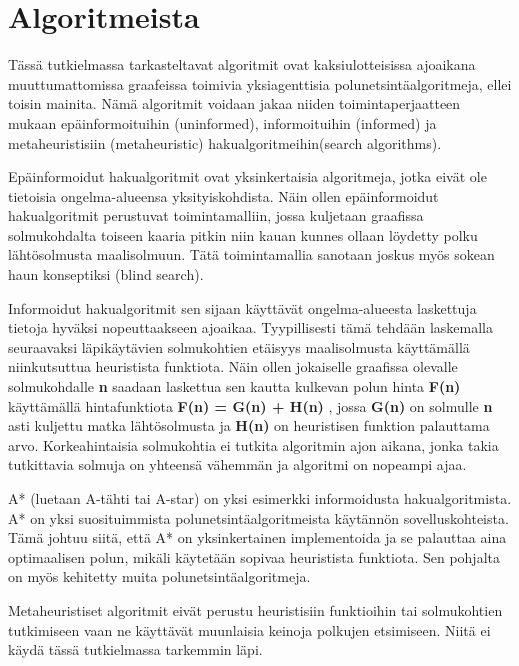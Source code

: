 \section{Algoritmeista}\label{algoritmeista}
Tässä tutkielmassa tarkasteltavat algoritmit ovat kaksiulotteisissa 
ajoaikana muuttumattomissa graafeissa toimivia yksiagenttisia 
polunetsintäalgoritmeja, ellei toisin mainita. Nämä algoritmit voidaan jakaa 
niiden toimintaperjaatteen mukaan epäinformoituihin (uninformed), 
informoituihin (informed) ja metaheuristisiin (metaheuristic) 
hakualgoritmeihin(search algorithms).\cite{applSciLawande}\par
	Epäinformoidut hakualgoritmit ovat yksinkertaisia algoritmeja, jotka 
eivät ole tietoisia ongelma-alueensa yksityiskohdista. Näin ollen 
epäinformoidut hakualgoritmit perustuvat toimintamalliin, jossa kuljetaan 
graafissa solmukohdalta toiseen kaaria pitkin niin kauan kunnes ollaan 
löydetty polku lähtösolmusta maalisolmuun. Tätä toimintamallia sanotaan 
joskus myös sokean haun konseptiksi (blind search).\cite{applSciLawande}\par
	Informoidut hakualgoritmit sen sijaan käyttävät ongelma-alueesta 
laskettuja tietoja hyväksi nopeuttaakseen ajoaikaa. Tyypillisesti tämä 
tehdään laskemalla seuraavaksi läpikäytävien solmukohtien etäisyys 
maalisolmusta käyttämällä niinkutsuttua heuristista funktiota. Näin ollen 
jokaiselle graafissa olevalle solmukohdalle \textbf{n} saadaan laskettua sen 
kautta kulkevan polun hinta \textbf{F(n)} käyttämällä hintafunktiota 
\textbf{F(n) = G(n) + H(n)} , jossa \textbf{G(n)} on solmulle \textbf{n} 
asti kuljettu matka lähtösolmusta ja \textbf{H(n)} on heuristisen funktion 
palauttama arvo. Korkeahintaisia solmukohtia ei tutkita algoritmin ajon 
aikana, jonka takia tutkittavia solmuja on yhteensä vähemmän ja algoritmi on 
nopeampi ajaa.\cite{applSciLawande}\par
	A* (luetaan A-tähti tai A-star) on yksi esimerkki informoidusta 
hakualgoritmista. A* on yksi suosituimmista polunetsintäalgoritmeista 
käytännön sovelluskohteista. Tämä johtuu siitä, että A* on yksinkertainen 
implementoida ja se palauttaa aina optimaalisen polun, mikäli käytetään 
sopivaa heuristista funktiota.\cite{MathewAndMalathy} Sen pohjalta on 
myös kehitetty muita polunetsintäalgoritmeja.\cite{applSciLawande}\par
	Metaheuristiset algoritmit eivät perustu heuristisiin funktioihin tai 
solmukohtien tutkimiseen vaan ne käyttävät muunlaisia keinoja polkujen 
etsimiseen.\cite{applSciLawande} Niitä ei käydä tässä tutkielmassa tarkemmin 
läpi.

